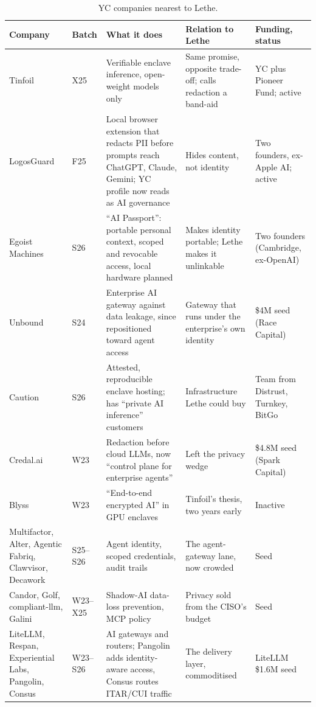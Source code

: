 \documentclass[10pt,a4paper]{article}
\newcommand{\tablefont}{\footnotesize\linespread{1.08}\selectfont\setlength{\tabcolsep}{4pt}%
  \renewcommand{\arraystretch}{1.22}\rowcolors{2}{white}{slate!6}%
  \let\origbottomrule\bottomrule\def\bottomrule{\origbottomrule\noalign{\global\rownum=0\relax}}}
\newcommand{\colhead}[1]{\textcolor{ink!70}{\bfseries #1}}
\begin{document}
\begin{table}[tbp]
\centering\tablefont
\caption{YC companies nearest to Lethe.}\label{tab:yc}
\begin{adjustbox}{trim=0pt,clip}
\begin{tabularx}{\textwidth}{@{}B{0.958}L{0.375}L{1.583}L{1.250}L{0.833}@{}}
\toprule
\colhead{Company} & \colhead{Batch} & \colhead{What it does} & \colhead{Relation to Lethe} & \colhead{Funding, status} \\
\midrule
Tinfoil & X25 & Verifiable enclave inference, open-weight models only & Same promise, opposite trade-off; calls redaction a band-aid & YC plus Pioneer Fund; active \\
LogosGuard & F25 & Local browser extension that redacts PII before prompts reach ChatGPT, Claude, Gemini; YC profile now reads as AI governance & Hides content, not identity & Two founders, ex-Apple AI; active \\
Egoist Machines & S26 & ``AI Passport'': portable personal context, scoped and revocable access, local hardware planned & Makes identity portable; Lethe makes it unlinkable & Two founders (Cambridge, ex-OpenAI) \\
Unbound & S24 & Enterprise AI gateway against data leakage, since repositioned toward agent access & Gateway that runs under the enterprise's own identity & \$4M seed (Race Capital) \\
Caution & S26 & Attested, reproducible enclave hosting; has ``private AI inference'' customers & Infrastructure Lethe could buy & Team from Distrust, Turnkey, BitGo \\
Credal.ai & W23 & Redaction before cloud LLMs, now ``control plane for enterprise agents'' & Left the privacy wedge & \$4.8M seed (Spark Capital) \\
Blyss & W23 & ``End-to-end encrypted AI'' in GPU enclaves & Tinfoil's thesis, two years early & Inactive \\
Multifactor, Alter, Agentic Fabriq, Clawvisor, Decawork & S25--S26 & Agent identity, scoped credentials, audit trails & The agent-gateway lane, now crowded & Seed \\
Candor, Golf, compliant-llm, Galini & W23--X25 & Shadow-AI data-loss prevention, MCP policy & Privacy sold from the CISO's budget & Seed \\
LiteLLM, Respan, Experiential Labs, Pangolin, Consus & W23--S26 & AI gateways and routers; Pangolin adds identity-aware access, Consus routes ITAR/CUI traffic & The delivery layer, commoditised & LiteLLM \$1.6M seed \\

\end{tabularx}
\end{adjustbox}
\end{table}
\end{document}
